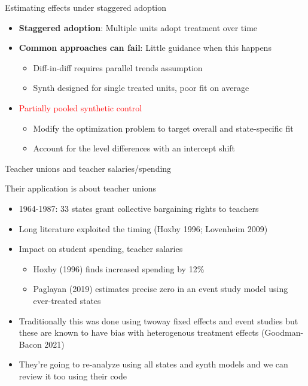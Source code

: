 \documentclass{beamer}
\begin{document}
\begin{frame}{Estimating effects under staggered adoption}

\begin{itemize}
\item \textbf{Staggered adoption}: Multiple units adopt treatment over time
\item \textbf{Common approaches can fail}: Little guidance when this happens
	\begin{itemize}
	\item Diff-in-diff requires parallel trends assumption
	\item Synth designed for single treated units, poor fit on average
	\end{itemize}
\item \textcolor{red}{Partially pooled synthetic control}
	\begin{itemize}
	\item Modify the optimization problem to target overall and state-specific fit
	\item Account for the level differences with an intercept shift
	\end{itemize}
\end{itemize}
\end{frame}





\begin{frame}{Teacher unions and teacher salaries/spending}

Their application is about teacher unions
\begin{itemize}
\item 1964-1987: 33 states grant collective bargaining rights to teachers
\item Long literature exploited the timing (Hoxby 1996; Lovenheim 2009)
\item Impact on student spending, teacher salaries
	\begin{itemize}
	\item Hoxby (1996) finds increased spending by 12\%
	\item Paglayan (2019) estimates precise zero in an event study model using ever-treated states
	\end{itemize}
\item Traditionally this was done using twoway fixed effects and event studies but these are known to have bias with heterogenous treatment effects (Goodman-Bacon 2021)
\item They're going to re-analyze using all states and synth models and we can review it too using their code
\end{itemize}

\end{frame}
\end{document}
